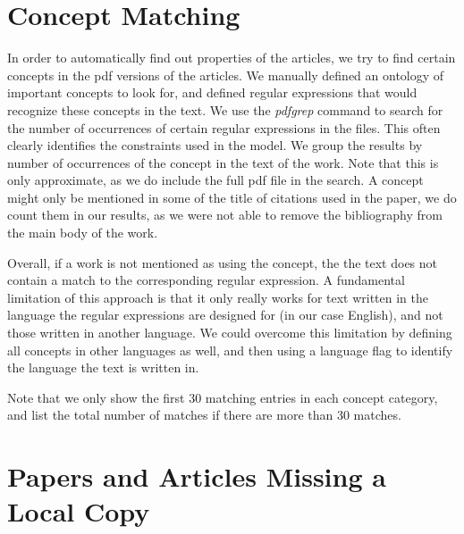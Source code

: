 \documentclass[a4paper]{article}
\begin{document}
\clearpage
\section{Concept Matching}

In order to automatically find out properties of the articles, we try to find certain concepts in the pdf versions of the articles. We manually defined an ontology of important concepts to look for, and defined regular expressions that would recognize these concepts in the text. We use the \emph{pdfgrep} command to search for the number of occurrences of certain regular expressions in the files. This often clearly identifies the constraints used in the model. We group the results by number of occurrences of the concept in the text of the work. Note that this is only approximate, as we do include the full pdf file in the search. A concept might only be mentioned in some of the title of citations used in the paper, we do count them in our results, as we were not able to remove the bibliography from the main body of the work.

Overall, if a work is not mentioned as using the concept, the the text does not contain a match to the corresponding regular expression. A fundamental limitation of this approach is that it only really works for text written in the language the regular expressions are designed for (in our case English), and not those written in another language. We could overcome this limitation by defining all concepts in other languages as well, and then using a language flag to identify the language the text is written in. 

Note that we only show the first 30 matching entries in each concept category, and list the total number of matches if there are more than 30 matches.














\clearpage
{}
{}





\appendix
\clearpage
\section{Papers and Articles Missing a Local Copy}
\end{document}
